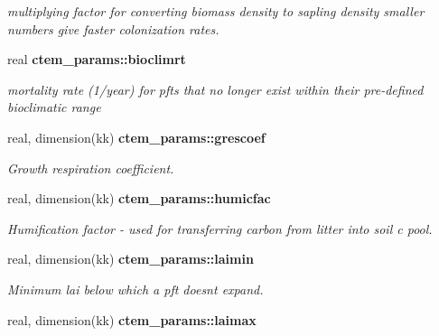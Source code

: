 \begin{DoxyCompactItemize}
\begin{DoxyCompactList}\small\item\em multiplying factor for converting biomass density to sapling density smaller numbers give faster colonization rates. \end{DoxyCompactList}\item 
\hypertarget{namespacectem__params_a6b5937d5ed79accdf5415c1ab6e1bc48}{}real {\bfseries ctem\+\_\+params\+::bioclimrt}\label{namespacectem__params_a6b5937d5ed79accdf5415c1ab6e1bc48}

\begin{DoxyCompactList}\small\item\em mortality rate (1/year) for pfts that no longer exist within their pre-\/defined bioclimatic range \end{DoxyCompactList}\item 
\hypertarget{namespacectem__params_a693738e0e1e8f1ff84250383c571b23a}{}real, dimension(kk) {\bfseries ctem\+\_\+params\+::grescoef}\label{namespacectem__params_a693738e0e1e8f1ff84250383c571b23a}

\begin{DoxyCompactList}\small\item\em Growth respiration coefficient. \end{DoxyCompactList}\item 
\hypertarget{namespacectem__params_a5c8f0977ee35f251a0c99293d0e91e56}{}real, dimension(kk) {\bfseries ctem\+\_\+params\+::humicfac}\label{namespacectem__params_a5c8f0977ee35f251a0c99293d0e91e56}

\begin{DoxyCompactList}\small\item\em Humification factor -\/ used for transferring carbon from litter into soil c pool. \end{DoxyCompactList}\item 
\hypertarget{namespacectem__params_a7a661dffd51da0f6b8c71a0f71fd2679}{}real, dimension(kk) {\bfseries ctem\+\_\+params\+::laimin}\label{namespacectem__params_a7a661dffd51da0f6b8c71a0f71fd2679}

\begin{DoxyCompactList}\small\item\em Minimum lai below which a pft doesn\textquotesingle{}t expand. \end{DoxyCompactList}\item 
\hypertarget{namespacectem__params_abec8d35477e7996256f26318e666f199}{}real, dimension(kk) {\bfseries ctem\+\_\+params\+::laimax}\label{namespacectem__params_abec8d35477e7996256f26318e666f199}


\end{DoxyCompactItemize}
